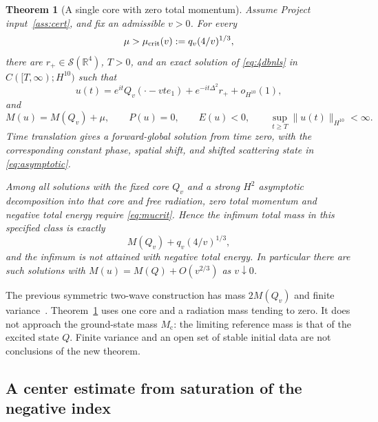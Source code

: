 \documentclass[11pt]{article}
\newtheorem{theorem}{Theorem}[section]
\theoremstyle{definition}
\theoremstyle{remark}
\newcommand{\R}{\mathbb R}
\newcommand{\norm}[1]{\lVert #1\rVert}
\newcommand{\mc}{M_{\mathrm c}}
\begin{document}
\begin{theorem}[A single core with zero total momentum]\label{thm:radiation}
Assume Project input~\ref{ass:cert}, and fix an admissible $v>0$. For every
\begin{equation}\label{eq:mucrit}
 \mu>\mu_{\rm crit}(v):=q_v(4/v)^{1/3},
\end{equation}
there are $r_+\in\mathcal S(\R^4)$, $T>0$, and an exact solution of \eqref{eq:4dbnls} in $C([T,\infty);H^{10})$ such that
\begin{equation}\label{eq:asymptotic}
 u(t)=e^{it}Q_v(\cdot-vte_1)+e^{-it\Delta^2}r_++o_{H^{10}}(1),
\end{equation}
and
\begin{equation}\label{eq:exactcharges}
 M(u)=M(Q_v)+\mu,\qquad P(u)=0,\qquad E(u)<0,
 \qquad \sup_{t\ge T}\norm{u(t)}_{H^{10}}<\infty.
\end{equation}
Time translation gives a forward-global solution from time zero, with the corresponding constant phase, spatial shift, and shifted scattering state in \eqref{eq:asymptotic}.

Among all solutions with the fixed core $Q_v$ and a strong $H^2$ asymptotic decomposition into that core and free radiation, zero total momentum and negative total energy require \eqref{eq:mucrit}. Hence the infimum total mass in this specified class is exactly
\begin{equation}\label{eq:classinf}
 M(Q_v)+q_v(4/v)^{1/3},
\end{equation}
and the infimum is not attained with negative total energy. In particular there are such solutions with $M(u)=M(Q)+O(v^{2/3})$ as $v\downarrow0$.
\end{theorem}

The previous symmetric two-wave construction has mass $2M(Q_v)$ and finite variance~\cite{ProjectR5}. Theorem~\ref{thm:radiation} uses one core and a radiation mass tending to zero. It does not approach the ground-state mass $\mc$: the limiting reference mass is that of the excited state $Q$. Finite variance and an open set of stable initial data are not conclusions of the new theorem.

\subsection{A center estimate from saturation of the negative index}
\end{document}
